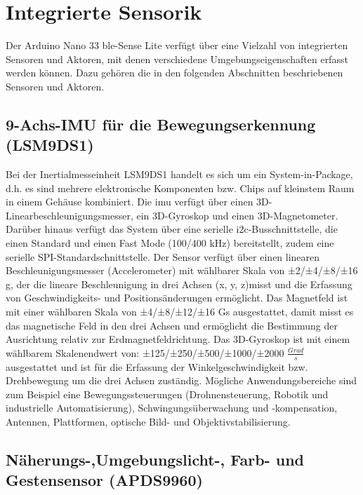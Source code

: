 \section{Integrierte Sensorik}

Der Arduino Nano 33 \ac{ble}-Sense Lite verfügt über eine Vielzahl von integrierten Sensoren und Aktoren, mit denen verschiedene Umgebungseigenschaften erfasst werden können. Dazu gehören die in den folgenden Abschnitten beschriebenen Sensoren und Aktoren.

\subsection{9-Achs-IMU für die Bewegungserkennung (LSM9DS1)}\label{9Achs}

Bei der Inertialmesseinheit LSM9DS1 handelt es sich um ein System-in-Package, d.h. es sind mehrere elektronische Komponenten bzw. Chips auf kleinstem Raum in einem Gehäuse kombiniert.\cite{Lienig.2012} Die \ac{imu} verfügt über einen 3D-Linearbeschleunigungsmesser, ein 3D-Gyroskop und einen 3D-Magnetometer. Darüber hinaus verfügt das System über eine serielle \ac{i2c}-Busschnittstelle, die einen Standard und einen Fast Mode (100/400 kHz) bereitstellt, zudem eine serielle SPI-Standardschnittstelle. Der Sensor verfügt über einen linearen Beschleunigungsmesser (Accelerometer) mit wählbarer Skala von ±2/±4/±8/±16 g, der die lineare Beschleunigung in drei Achsen (x, y, z)misst und die Erfassung von Geschwindigkeits- und Positionsänderungen ermöglicht. Das Magnetfeld ist mit einer wählbaren Skala von ±4/±8/±12/±16 Gs ausgestattet, damit misst es das magnetische Feld in den drei Achsen und ermöglicht die Bestimmung der Ausrichtung relativ zur Erdmagnetfeldrichtung. Das 3D-Gyroskop ist mit einem wählbarem Skalenendwert von: ±125/±250/±500/±1000/±2000 $\frac{Grad}{s}$ ausgestattet und ist für die Erfassung der Winkelgeschwindigkeit bzw. Drehbewegung um die drei Achsen zuständig.\cite{STM1.2015}\cite{Ard.2024}
Mögliche Anwendungsbereiche sind zum Beispiel eine Bewegungssteuerungen (Drohnensteuerung, Robotik und industrielle Automatisierung), Schwingungsüberwachung und -kompensation, Antennen, Plattformen, optische Bild- und Objektivstabilisierung.  

\subsection{Näherungs-,Umgebungslicht-, Farb- und Gestensensor (APDS9960)}

